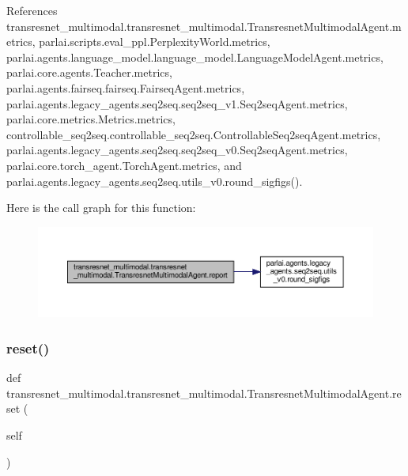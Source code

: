 References transresnet\+\_\+multimodal.\+transresnet\+\_\+multimodal.\+Transresnet\+Multimodal\+Agent.\+metrics, parlai.\+scripts.\+eval\+\_\+ppl.\+Perplexity\+World.\+metrics, parlai.\+agents.\+language\+\_\+model.\+language\+\_\+model.\+Language\+Model\+Agent.\+metrics, parlai.\+core.\+agents.\+Teacher.\+metrics, parlai.\+agents.\+fairseq.\+fairseq.\+Fairseq\+Agent.\+metrics, parlai.\+agents.\+legacy\+\_\+agents.\+seq2seq.\+seq2seq\+\_\+v1.\+Seq2seq\+Agent.\+metrics, parlai.\+core.\+metrics.\+Metrics.\+metrics, controllable\+\_\+seq2seq.\+controllable\+\_\+seq2seq.\+Controllable\+Seq2seq\+Agent.\+metrics, parlai.\+agents.\+legacy\+\_\+agents.\+seq2seq.\+seq2seq\+\_\+v0.\+Seq2seq\+Agent.\+metrics, parlai.\+core.\+torch\+\_\+agent.\+Torch\+Agent.\+metrics, and parlai.\+agents.\+legacy\+\_\+agents.\+seq2seq.\+utils\+\_\+v0.\+round\+\_\+sigfigs().

Here is the call graph for this function\+:
\nopagebreak
\begin{figure}[H]
\begin{center}
\leavevmode
\includegraphics[width=350pt]{classtransresnet__multimodal_1_1transresnet__multimodal_1_1TransresnetMultimodalAgent_a3cae694653b6742f5946b33828a4e641_cgraph}
\end{center}
\end{figure}
\mbox{\label{classtransresnet__multimodal_1_1transresnet__multimodal_1_1TransresnetMultimodalAgent_a00c3b4f89a4a7538ffa3be4d7abaf73e}} 
\subsubsection{\texorpdfstring{reset()}{reset()}}
{\footnotesize\ttfamily def transresnet\+\_\+multimodal.\+transresnet\+\_\+multimodal.\+Transresnet\+Multimodal\+Agent.\+reset (\begin{DoxyParamCaption}\item[{}]{self }\end{DoxyParamCaption})}

